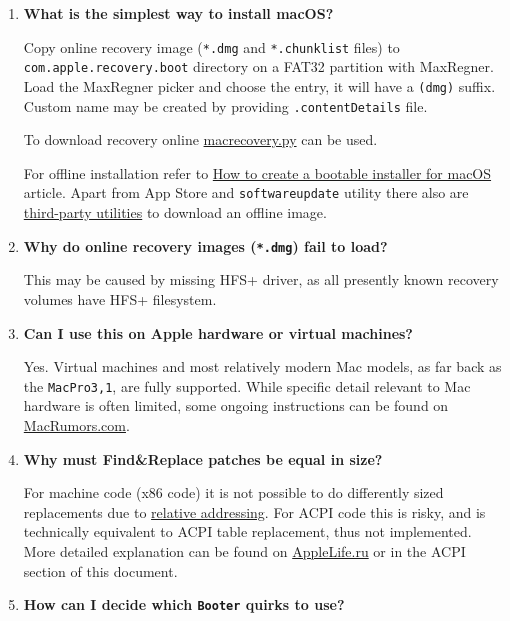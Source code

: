 \documentclass[]{article}
\makeatletter
\renewcommand{\label}[1]{%
\zref@wrapper@immediate{\oldlabel{#1}}}  %
\makeatother
\begin{document}
\begin{enumerate}
\item \label{reinstallmacos}
  \textbf{What is the simplest way to install macOS?}

  Copy online recovery image (\texttt{*.dmg} and \texttt{*.chunklist} files)
  to \texttt{com.apple.recovery.boot} directory on a FAT32 partition with MaxRegner.
  Load the MaxRegner picker and choose the entry, it will have a \texttt{(dmg)} suffix.
  Custom name may be created by providing \texttt{.contentDetails} file.

  To download recovery online
  \href{https://github.com/acidanthera/MaxRegnerPkg/blob/master/Utilities/macrecovery/macrecovery.py}{macrecovery.py}
  can be used.

  For offline installation refer to
  \href{https://support.apple.com/HT201372}{How to create a bootable installer for macOS}
  article. Apart from App Store and \texttt{softwareupdate} utility there also are
  \href{https://github.com/corpnewt/gibMacOS}{third-party utilities} to download an offline image.

\item
  \textbf{Why do online recovery images (\texttt{*.dmg}) fail to load?}

  This may be caused by missing HFS+ driver, as all presently known recovery volumes
  have HFS+ filesystem.

\item
  \textbf{Can I use this on Apple hardware or virtual machines?}

  Yes. Virtual machines and most relatively modern Mac models, as far back as the \texttt{MacPro3,1},
  are fully supported. While specific detail relevant to Mac hardware is often limited,
  some ongoing instructions can be found on
  \href{https://forums.macrumors.com/threads/2207814}{MacRumors.com}.

\item
  \textbf{Why must Find\&Replace patches be equal in size?}

  For machine code (x86 code) it is not possible to do differently sized replacements due to
  \href{https://en.wikipedia.org/w/index.php?title=Relative_addressing}{relative addressing}.
  For ACPI code this is risky, and is technically equivalent to ACPI table replacement,
  thus not implemented. More detailed explanation can be found on
  \href{https://applelife.ru/posts/819790}{AppleLife.ru} or in the ACPI section of this document.

\item
  \textbf{How can I decide which \texttt{Booter} quirks to use?}


\end{enumerate}
\end{document}
